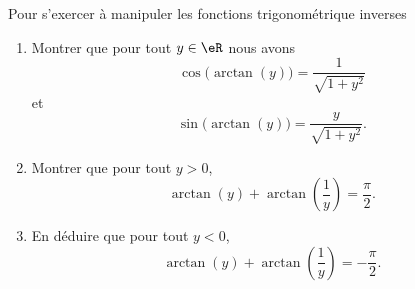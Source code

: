 
\begin{exercice}\label{exoanalyseCTU-0005}
    
    Pour s'exercer à manipuler les fonctions trigonométrique inverses
    \begin{enumerate}
        \item
            Montrer que pour tout \( y\in \eR\) nous avons
            \begin{equation}
                \cos\big( \arctan(y) \big)=\frac{1}{ \sqrt{1+y^2} }
            \end{equation}
            et
            \begin{equation}
                \sin\big( \arctan(y) \big)=\frac{ y }{ \sqrt{1+y^2} }.
            \end{equation}
        \item
            Montrer que pour tout \( y>0\),
            \begin{equation}
                \arctan(y)+\arctan(\frac{1}{ y })=\frac{ \pi }{2}.
            \end{equation}
        \item
            En déduire que pour tout \( y<0\),
            \begin{equation}
                \arctan(y)+\arctan(\frac{1}{ y })=-\frac{ \pi }{ 2 }.
            \end{equation}
    \end{enumerate}

\end{exercice}
